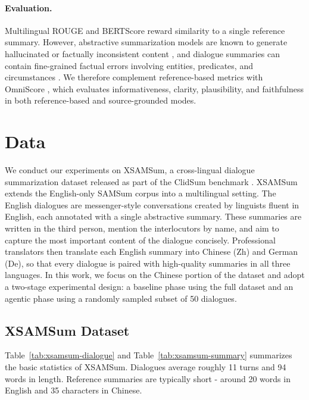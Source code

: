 \documentclass[11pt]{article}
\begin{document}
\paragraph{Evaluation.}
Multilingual ROUGE \citep{hasan-etal-2021-xl} and BERTScore \citep{zhang2020bertscore} reward similarity to a single reference summary. However, abstractive summarization models are known to generate hallucinated or factually inconsistent content \citep{maynez-etal-2020-faithfulness}, and dialogue summaries can contain fine-grained factual errors involving entities, predicates, and circumstances \citep{zhu-etal-2023-diasumfact}. We therefore complement reference-based metrics with OmniScore \citep{alam-omniscore}, which evaluates informativeness, clarity, plausibility, and faithfulness in both reference-based and source-grounded modes.

\section{Data}
\label{sec:data}
We conduct our experiments on XSAMSum, a cross-lingual dialogue summarization dataset released as part of the ClidSum benchmark \citep{wang-etal-2022-clidsum}. XSAMSum extends the English-only SAMSum corpus \citep{gliwa-etal-2019-samsum} into a multilingual setting. The English dialogues are messenger-style conversations created by linguists fluent in English, each annotated with a single abstractive summary. These summaries are written in the third person, mention the interlocutors by name, and aim to capture the most important content of the dialogue concisely. Professional translators then translate each English summary into Chinese (Zh) and German (De), so that every dialogue is paired with high-quality summaries in all three languages. In this work, we focus on the Chinese portion of the dataset and adopt a two-stage experimental design: a baseline phase using the full dataset and an agentic phase using a randomly sampled subset of 50 dialogues.




\subsection{XSAMSum Dataset}

Table~\ref{tab:xsamsum-dialogue} and Table~\ref{tab:xsamsum-summary} summarizes the basic statistics of XSAMSum. Dialogues average roughly 11 turns and 94 words in length. Reference summaries are typically short - around 20 words in English and 35 characters in Chinese.
\end{document}
